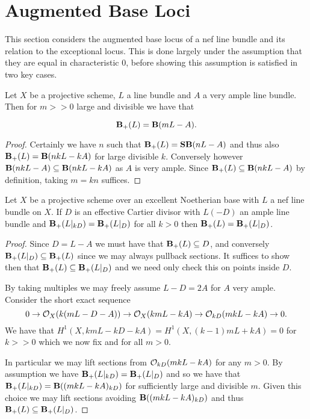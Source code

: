 \section{Augmented Base Loci}

This section considers the augmented base locus of a nef line bundle and its relation to the exceptional locus. This is done largely under the assumption that they are equal in characteristic $0$, before showing this assumption is satisfied in two key cases.


\begin{lemma}\label{amp}
	Let $X$ be a projective scheme, $L$ a line bundle and $A$ a very ample line bundle. Then for $m>>0$ large and divisible we have that 
	
	$$\BS(L)=\BB(mL-A).$$
\end{lemma}

\begin{proof}
	Certainly we have $n$ such that $\BS(L)=\SB(nL-A)$ and thus also $\BS(L)=\BB(nkL-kA)$ for large divisible $k$. Conversely however $\BB(nkL-A)\subseteq \BB(nkL-kA)$ as $A$ is very ample. Since $\BS(L)\subseteq \BB(nkL-A)$ by definition, taking $m=kn$ suffices.
\end{proof}

\begin{lemma}
	Let $X$ be a projective scheme over an excellent Noetherian base with $L$ a nef line bundle on $X$. If $D$ is an effective Cartier divisor with $L(-D)$ an ample line bundle and $\BS(L|_{kD})=\BS(L|_{D})$ for all $k > 0$ then $\BS(L)=\BS(L|_{D})$.
\end{lemma}

\begin{proof}
	Since $D=L-A$ we must have that $\BS(L) \subseteq D$, and conversely $\BS(L|_{D}) \subseteq \BS(L)$ since we may always pullback sections. It suffices to show then that $\BS(L) \subseteq \BS(L|_{D})$ and we need only check this on points inside $D$.
	
	By taking multiples we may freely assume $L-D=2A$ for $A$ very ample. Consider the short exact sequence
	\[0 \to \ox(k(mL-D-A))\to \ox(kmL-kA) \to \ox[kD](mkL-kA) \to 0.\]
	We have that $H^{1}(X,kmL-kD-kA)=H^{1}(X,(k-1)mL+kA)=0$ for $k >>0$ which we now fix and for all $m >0$.
	
	In particular we may lift sections from $\ox[kD](mkL-kA)$ for any $m>0$. By assumption we have $\BS(L|_{kD})=\BS(L|_{D})$ and so we have that $\BS(L|_{kD})=\BB((mkL-kA)_{kD})$ for sufficiently large and divisible $m$. Given this choice we may lift sections avoiding $\BB((mkL-kA)_{kD})$ and thus $\BS(L) \subseteq \BS(L|_{D})$.
\end{proof}

